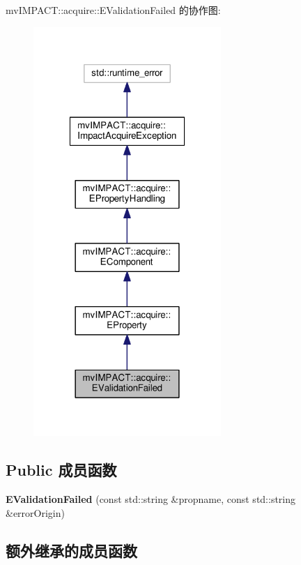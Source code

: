 mv\+I\+M\+P\+A\+C\+T\+:\+:acquire\+:\+:E\+Validation\+Failed 的协作图\+:
\nopagebreak
\begin{figure}[H]
\begin{center}
\leavevmode
\includegraphics[width=202pt]{classmv_i_m_p_a_c_t_1_1acquire_1_1_e_validation_failed__coll__graph}
\end{center}
\end{figure}
\subsection*{Public 成员函数}
\begin{DoxyCompactItemize}
\item 
\hypertarget{classmv_i_m_p_a_c_t_1_1acquire_1_1_e_validation_failed_ad604f51a9555864037f1915da53c4305}{{\bfseries E\+Validation\+Failed} (const std\+::string \&propname, const std\+::string \&error\+Origin)}\label{classmv_i_m_p_a_c_t_1_1acquire_1_1_e_validation_failed_ad604f51a9555864037f1915da53c4305}

\end{DoxyCompactItemize}
\subsection*{额外继承的成员函数}


